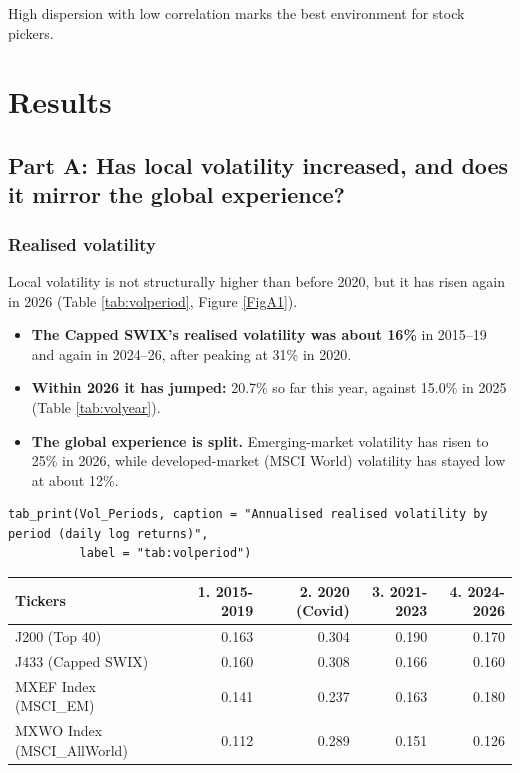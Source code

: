 \documentclass[11pt,preprint]{elsarticle}
\let\origtable\table
\let\endorigtable\endtable
\renewenvironment{table}[1][2] {
    \expandafter\origtable\expandafter[H]
} {
    \endorigtable
}
\numberwithin{equation}{section}
\numberwithin{figure}{section}
\numberwithin{table}{section}
\def\tightlist{} %
\begin{document}
High dispersion with low correlation marks the best environment for
stock pickers.

\section{\texorpdfstring{Results
\label{Results}}{Results }}\label{results}

\subsection{Part A: Has local volatility increased, and does it mirror
the global
experience?}\label{part-a-has-local-volatility-increased-and-does-it-mirror-the-global-experience}

\subsubsection{Realised volatility}\label{realised-volatility}

Local volatility is not structurally higher than before 2020, but it has
risen again in 2026 (Table \ref{tab:volperiod}, Figure \ref{FigA1}).

\begin{itemize}
\tightlist
\item
  \textbf{The Capped SWIX's realised volatility was about 16\%} in
  2015--19 and again in 2024--26, after peaking at 31\% in 2020.
\item
  \textbf{Within 2026 it has jumped:} 20.7\% so far this year, against
  15.0\% in 2025 (Table \ref{tab:volyear}).
\item
  \textbf{The global experience is split.} Emerging-market volatility
  has risen to 25\% in 2026, while developed-market (MSCI World)
  volatility has stayed low at about 12\%.
\end{itemize}

\begin{verbatim}
tab_print(Vol_Periods, caption = "Annualised realised volatility by period (daily log returns)",
          label = "tab:volperiod")
\end{verbatim}

\begin{table}[!htbp]
\centering
\caption{Annualised realised volatility by period (daily log returns)} 
\label{tab:volperiod}
\begingroup\footnotesize
\begin{tabular}{lrrrr}
  \hline
Tickers & 1. 2015-2019 & 2. 2020 (Covid) & 3. 2021-2023 & 4. 2024-2026 \\ 
  \hline
J200 (Top 40) & 0.163 & 0.304 & 0.190 & 0.170 \\ 
  J433 (Capped SWIX) & 0.160 & 0.308 & 0.166 & 0.160 \\ 
  MXEF Index (MSCI\_EM) & 0.141 & 0.237 & 0.163 & 0.180 \\ 
  MXWO Index (MSCI\_AllWorld) & 0.112 & 0.289 & 0.151 & 0.126 \\ 
   \hline
\end{tabular}
\endgroup
\end{table}
\end{document}
